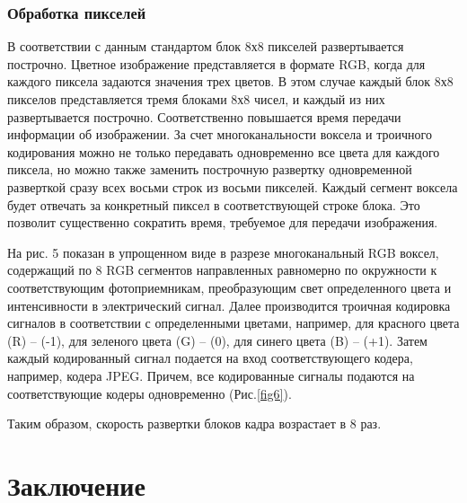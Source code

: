 \documentclass[10pt]{beamer}
\begin{document}
\subsubsection{Обработка пикселей}
\begin{frame}[shrink=20,fragile]
\transdissolve[duration=0.2]
\begin{block}{}
	В соответствии с данным стандартом блок 8х8 пикселей развертывается построчно. Цветное изображение представляется в формате RGB, когда для каждого пиксела задаются значения трех цветов. В этом случае каждый блок 8х8 пикселов представляется тремя блоками 8х8 чисел, и каждый из них развертывается построчно. Соответственно повышается время передачи информации об изображении. За счет многоканальности воксела и троичного кодирования можно не только передавать одновременно все цвета для каждого пиксела, но можно также заменить построчную развертку одновременной разверткой сразу всех восьми строк из восьми пикселей. Каждый сегмент воксела будет отвечать за конкретный пиксел в соответствующей строке блока. Это позволит существенно сократить время, требуемое для передачи изображения.
	
	На рис. 5 показан в упрощенном виде в разрезе многоканальный RGB воксел, содержащий по 8 RGB сегментов направленных равномерно по окружности к соответствующим фотоприемникам, преобразующим свет определенного цвета и интенсивности в электрический сигнал. Далее производится троичная кодировка сигналов в соответствии с определенными цветами, например, для красного цвета (R) – (-1), для зеленого цвета (G) – (0), для синего цвета
(B)	– (+1). Затем каждый кодированный сигнал подается на вход соответствующего кодера, например, кодера JPEG. Причем, все кодированные сигналы подаются на соответствующие кодеры одновременно (Рис.\ref{fig6}).
	
	Таким образом, скорость развертки блоков кадра возрастает в 8 раз.
\end{block}   
\end{frame}

\section{Заключение}
\end{document}

